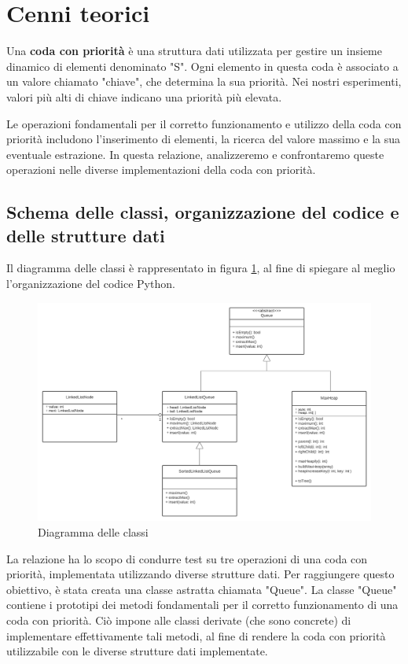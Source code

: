 \documentclass{article}
\begin{document}
\label{sec:usoLibrerie}

\clearpage

\section{Cenni teorici}
Una \textbf{coda con priorità} è una struttura dati utilizzata per gestire un insieme dinamico di elementi denominato "S". Ogni elemento in questa coda è associato a un valore chiamato "chiave", che determina la sua priorità. Nei nostri esperimenti, valori più alti di chiave indicano una priorità più elevata.

Le operazioni fondamentali per il corretto funzionamento e utilizzo della coda con priorità includono l'inserimento di elementi, la ricerca del valore massimo e la sua eventuale estrazione. In questa relazione, analizzeremo e confrontaremo queste operazioni nelle diverse implementazioni della coda con priorità.

\subsection{Schema delle classi, organizzazione del codice e delle strutture dati}
Il diagramma delle classi è rappresentato in figura \ref{fig: DiagrammaDelleClassi}, al fine di spiegare al meglio l'organizzazione del codice Python. 

\begin{figure}[h]
    \includegraphics[width=1\textwidth]{Images/DiagrammaDelleClassi.png}
    \centering
    \caption{Diagramma delle classi}
    \label{fig: DiagrammaDelleClassi}
\end{figure}

La relazione ha lo scopo di condurre test su tre operazioni di una coda con priorità, implementata utilizzando diverse strutture dati. Per raggiungere questo obiettivo, è stata creata una classe astratta chiamata "Queue". La classe "Queue" contiene i prototipi dei metodi fondamentali per il corretto funzionamento di una coda con priorità. Ciò impone alle classi derivate (che sono concrete) di implementare effettivamente tali metodi, al fine di rendere la coda con priorità utilizzabile con le diverse strutture dati implementate.
\end{document}

